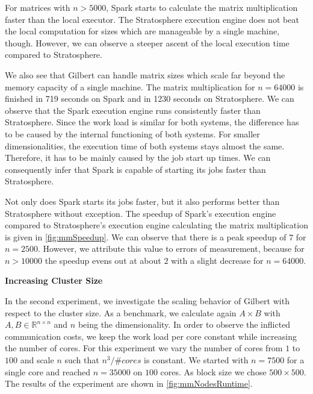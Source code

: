 For matrices with $n>5000$, Spark starts to calculate the matrix multiplication faster than the local executor.
The Stratosphere execution engine does not beat the local computation for sizes which are manageable by a single machine, though.
However, we can observe a steeper ascent of the local execution time compared to Stratosphere.

We also see that Gilbert can handle matrix sizes which scale far beyond the memory capacity of a single machine.
The matrix multiplication for $n=64000$ is finished in 719 seconds on Spark and in 1230 seconds on Stratosphere.
We can observe that the Spark execution engine runs consistently faster than Stratosphere.
Since the work load is similar for both systems, the difference has to be caused by the internal functioning of both systems.
For smaller dimensionalities, the execution time of both systems stays almost the same.
Therefore, it has to be mainly caused by the job start up times.
We can consequently infer that Spark is capable of starting its jobs faster than Stratosphere.

Not only does Spark starts its jobs faster, but it also performs better than Stratosphere without exception.
The speedup of Spark's execution engine compared to Stratosphere's execution engine calculating the matrix multiplication is given in \cref{fig:mmSpeedup}.
We can observe that there is a peak speedup of $7$ for $n=2500$.
However, we attribute this value to errors of measurement, because for $n>10000$ the speedup evens out at about $2$ with a slight decrease for $n=64000$.

\textbf{Increasing Cluster Size}

In the second experiment, we investigate the scaling behavior of Gilbert with respect to the cluster size.
As a benchmark, we calculate again $A\times B$ with $A,B \in \mathbb{R}^{n\times n}$ and $n$ being the dimensionality.
In order to observe the inflicted communication costs, we keep the work load per core constant while increasing the number of cores.
For this experiment we vary the number of cores from $1$ to $100$ and scale $n$ such that $n^3/\#cores$ is constant.
We started with $n=7500$ for a single core and reached $n=35000$ on $100$ cores.
As block size we chose $500\times 500$.
The results of the experiment are shown in \cref{fig:mmNodesRuntime}.

